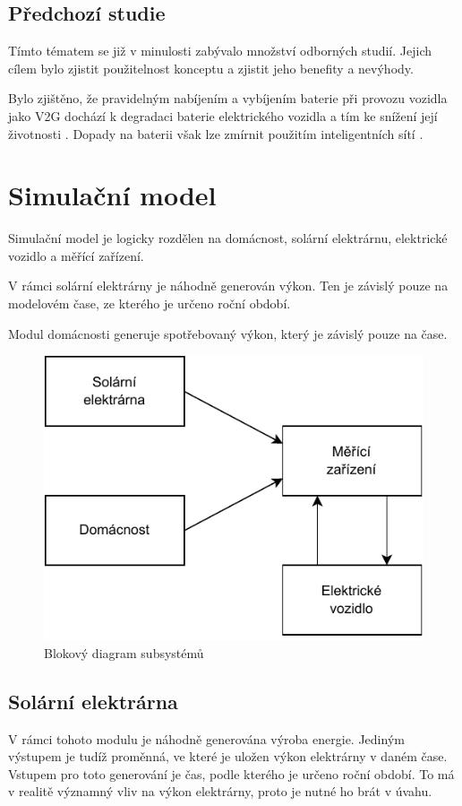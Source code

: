 \documentclass[12pt,a4paper]{Cotmas-2018}
\begin{document}
\subsection{Předchozí studie}
Tímto tématem se již v minulosti zabývalo množství odborných studií. Jejich cílem bylo zjistit použitelnost konceptu a zjistit jeho benefity a nevýhody. 

Bylo zjištěno, že pravidelným nabíjením a vybíjením baterie při provozu vozidla jako V2G dochází k degradaci baterie elektrického vozidla a tím ke snížení její životnosti 
\cite{Shirazi-2018}.
Dopady na baterii však lze zmírnit použitím inteligentních sítí 
\cite{University-of-Warwick-2017}.

\section{Simulační model}
Simulační model je logicky rozdělen na domácnost, solární elektrárnu, elektrické vozidlo a měřící zařízení.

V rámci solární elektrárny je náhodně generován výkon.
Ten je závislý pouze na modelovém čase, ze kterého je určeno roční období.

Modul domácnosti generuje spotřebovaný výkon, který je závislý pouze na čase.

\begin{figure}[H]
\begin{center}
\includegraphics[width=0.6\linewidth]{img/diagram.pdf}
\caption{Blokový diagram subsystémů}
\end{center}
\label{fig:solar_month}
\end{figure}

\subsection{Solární elektrárna}
V rámci tohoto modulu je náhodně generována výroba energie.
Jediným výstupem je tudíž proměnná, ve které je uložen výkon elektrárny v daném čase.
Vstupem pro toto generování je čas, podle kterého je určeno roční období.
To má v realitě významný vliv na výkon elektrárny, proto je nutné ho brát v úvahu.
\end{document}
